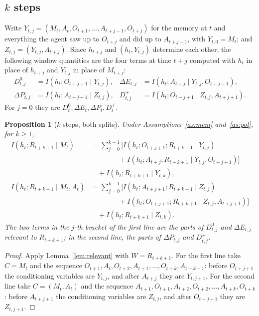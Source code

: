 \documentclass{article}
\newtheorem{proposition}{Proposition}
\theoremstyle{definition}
\theoremstyle{remark}
\newcommand{\dE}{\Delta E}
\newcommand{\dP}{\Delta P}
\begin{document}
\subsection{$k$ steps}

Write $Y_{t,j}=(M_t,A_t,O_{t+1},\dots,A_{t+j-1},O_{t+j})$ for the memory at $t$ and everything the agent saw up to $O_{t+j}$ and did up to $A_{t+j-1}$, with $Y_{t,0}=M_t$; and $Z_{t,j}=(Y_{t,j},A_{t+j})$. Since $h_{t+j}$ and $(h_t,Y_{t,j})$ determine each other, the following window quantities are the four terms at time $t+j$ computed with $h_t$ in place of $h_{t+j}$ and $Y_{t,j}$ in place of $M_{t+j}$:
\begin{align*}
D^{0}_{t,j}&=I(h_t;O_{t+j+1}\mid Y_{t,j}), & \dE_{t,j}&=I(h_t;A_{t+j}\mid Y_{t,j},O_{t+j+1}),\\
\dP_{t,j}&=I(h_t;A_{t+j+1}\mid Z_{t,j}), & D^{+}_{t,j}&=I(h_t;O_{t+j+1}\mid Z_{t,j},A_{t+j+1}).
\end{align*}
For $j=0$ they are $D^0_t,\dE_t,\dP_t,D^+_t$.

\begin{proposition}[$k$ steps, both splits]\label{prop:k-steps}
Under Assumptions~\ref{as:mem} and~\ref{as:pol}, for $k\ge1$,
\begin{align*}
I(h_t;R_{t+k+1}\mid M_t)&=\sum_{j=0}^{k-1}\Big[I(h_t;O_{t+j+1};R_{t+k+1}\mid Y_{t,j})\\
&\qquad\qquad+I(h_t;A_{t+j};R_{t+k+1}\mid Y_{t,j},O_{t+j+1})\Big]\\
&\quad+I(h_t;R_{t+k+1}\mid Y_{t,k}),\\
I(h_t;R_{t+k+1}\mid M_t,A_t)&=\sum_{j=0}^{k-1}\Big[I(h_t;A_{t+j+1};R_{t+k+1}\mid Z_{t,j})\\
&\qquad\qquad+I(h_t;O_{t+j+1};R_{t+k+1}\mid Z_{t,j},A_{t+j+1})\Big]\\
&\quad+I(h_t;R_{t+k+1}\mid Z_{t,k}).
\end{align*}
The two terms in the $j$-th bracket of the first line are the parts of $D^0_{t,j}$ and $\dE_{t,j}$ relevant to $R_{t+k+1}$; in the second line, the parts of $\dP_{t,j}$ and $D^+_{t,j}$.
\end{proposition}

\begin{proof}
Apply Lemma~\ref{lem:relevant} with $W=R_{t+k+1}$. For the first line take $C=M_t$ and the sequence $O_{t+1},A_t,O_{t+2},A_{t+1},\dots,O_{t+k},A_{t+k-1}$: before $O_{t+j+1}$ the conditioning variables are $Y_{t,j}$, and after $A_{t+j}$ they are $Y_{t,j+1}$. For the second line take $C=(M_t,A_t)$ and the sequence $A_{t+1},O_{t+1},A_{t+2},O_{t+2},\dots,A_{t+k},O_{t+k}$: before $A_{t+j+1}$ the conditioning variables are $Z_{t,j}$, and after $O_{t+j+1}$ they are $Z_{t,j+1}$.
\end{proof}
\end{document}
